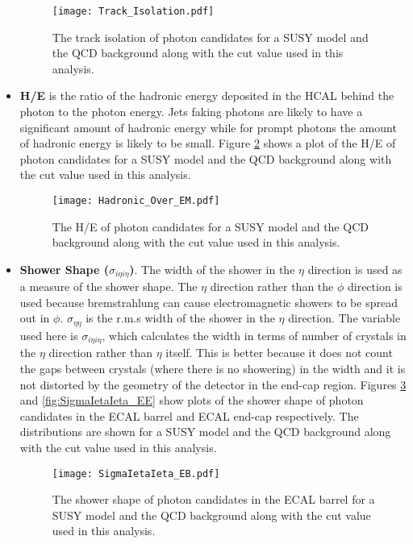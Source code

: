 \begin{itemize}
\begin{figure}
\begin{center}
\texttt{[image: Track\_Isolation.pdf]}
\end{center}
\caption{The track isolation of photon candidates for a SUSY model and the QCD 
background along with the cut value used in this analysis.}
\label{fig:Track_Isolation}
\end{figure}

\item {\bf H/E} is the ratio of the hadronic energy deposited in the HCAL behind
the photon to the photon energy. Jets faking photons are likely to have a 
significant amount of hadronic energy while for prompt photons the amount of 
hadronic energy is likely to be small. Figure \ref{fig:Hadronic_Over_EM} shows a
plot of the H/E of photon candidates for a SUSY model and the QCD background 
along with the cut value used in this analysis.

\begin{figure}
\begin{center}
\texttt{[image: Hadronic\_Over\_EM.pdf]}
\end{center}
\caption{The H/E of photon candidates for a SUSY model and the QCD background 
along with the cut value used in this analysis.}
\label{fig:Hadronic_Over_EM}
\end{figure}

\item {\bf Shower Shape ($\sigma_{i\eta i\eta}$)}. The width of the shower in 
the $\eta$ direction is used as a measure of the shower shape. The $\eta$ 
direction rather than the $\phi$ direction is used because bremstrahlung can 
cause electromagnetic showers to be spread out in $\phi$. $\sigma_{\eta\eta}$ is
the r.m.s width of the shower in the $\eta$ direction. The variable used here is
$\sigma_{i\eta i\eta}$, which calculates the width in terms of number of 
crystals in the $\eta$ direction rather than $\eta$ itself. This is better 
because it does not count the gaps between crystals (where there is no 
showering) in the width and it is not distorted by the geometry of the detector 
in the end-cap region. Figures \ref{fig:SigmaIetaIeta_EB} and
\ref{fig:SigmaIetaIeta_EE} show plots of the shower shape of photon candidates 
in the ECAL barrel and ECAL end-cap respectively. The distributions are shown 
for a SUSY model and the QCD background along with the cut value used in this 
analysis.

\begin{figure}
\begin{center}
\texttt{[image: SigmaIetaIeta\_EB.pdf]}
\end{center}
\caption{The shower shape of photon candidates in the ECAL barrel for a SUSY 
model and the QCD background along with the cut value used in this analysis.} 
\label{fig:SigmaIetaIeta_EB}
\end{figure}


\end{itemize}
